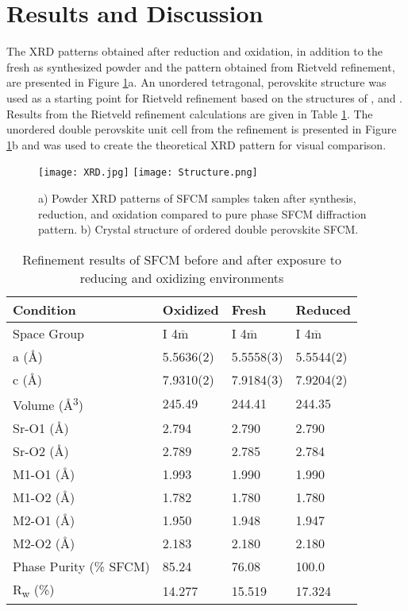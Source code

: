 \section{Results and Discussion}
    The XRD patterns obtained after reduction and oxidation, in addition to the fresh as synthesized powder and the pattern obtained from Rietveld refinement, are presented in Figure \ref{fig:structure}a.
    An unordered tetragonal, perovskite structure was used as a starting point for Rietveld refinement based on the structures of ,  and .\cite{Huang2009,Ritter2004}
    Results from the Rietveld refinement calculations are given in Table \ref{tab:xrdrefine}.
    The unordered double perovskite unit cell from the refinement is presented in Figure \ref{fig:structure}b and was used to create the theoretical XRD pattern for visual comparison.

    \begin{figure}
      \texttt{[image: XRD.jpg]}
      \texttt{[image: Structure.png]}
      \caption{a) Powder XRD patterns of SFCM samples taken after synthesis, reduction, and oxidation compared to pure phase SFCM diffraction pattern. b) Crystal structure of ordered double perovskite SFCM. }
      \label{fig:structure}
    \end{figure}

    \begin{table}
        \centering
        \caption{Refinement results of SFCM before and after exposure to reducing and oxidizing environments}
        \label{tab:xrdrefine}
        \begin{tabular}{llll}
        Condition & Oxidized & Fresh   & Reduced  \\
        \hline
        Space Group                & I 4$\overline{\text{m}}$    & I 4$\overline{\text{m}}$   & I 4$\overline{\text{m}}$    \\
        a (\si{\angstrom})        & 5.5636(2)   & 5.5558(3)  & 5.5544(2)   \\
        c (\si{\angstrom})        & 7.9310(2)   & 7.9184(3)  & 7.9204(2)   \\
        Volume (\si{\angstrom\cubed}) & 245.49  & 244.41 & 244.35  \\
        Sr-O1 (\si{\angstrom})    & 2.794  & 2.790 & 2.790   \\
        Sr-O2 (\si{\angstrom})    & 2.789  & 2.785 & 2.784   \\
        M1-O1 (\si{\angstrom})    & 1.993  & 1.990 & 1.990   \\
        M1-O2 (\si{\angstrom})    & 1.782  & 1.780 & 1.780   \\
        M2-O1 (\si{\angstrom})    & 1.950  & 1.948 & 1.947   \\
        M2-O2 (\si{\angstrom})    & 2.183  & 2.180 & 2.180   \\
        Phase Purity (\% SFCM)    & 85.24  & 76.08 & 100.0   \\
        R\textsubscript{w} (\%)   & 14.277 & 15.519 & 17.324
        \end{tabular}
        \end{table}

